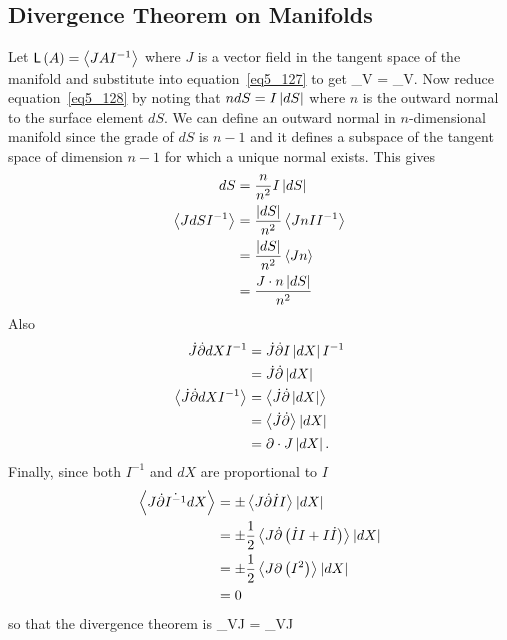 \subsection{Divergence Theorem on Manifolds}
Let ${\mathsf{L}}\left ( {A} \right ) = \left < {JAI^{-1}} \right >_{}$ where $J$ is a vector field in the tangent space of the manifold and substitute into
equation~\ref{eq5_127} to get
\be\label{eq5_128}
 \oint_{\partial V} = \int_{V}.
\ee
Now reduce equation~\ref{eq5_128} by noting that $ndS = I\left | {dS} \right |$ where $n$ is the outward normal to the surface element $dS$. We can define
an outward normal in $n$-dimensional manifold since the grade of $dS$ is $n-1$ and it defines a subspace of the tangent space of dimension $n-1$
for which a unique normal exists. This gives
\begin{align}
dS &= \displaystyle\frac{n}{n^{2}}I\left | {dS} \right | \\
\left < {J dS I^{-1}} \right >_{} &= \displaystyle\frac{\left | {dS} \right |}{n^{2}}\left < {JnII^{-1}} \right >_{} \nonumber \\
                      &= \displaystyle\frac{\left | {dS} \right |}{n^{2}}\left < {Jn} \right >_{} \nonumber \\
                      &= \displaystyle\frac{J\cdot n\left | {dS} \right |}{n^{2}} 
\end{align}
Also
\begin{align}
\dot{J}\dot{\partial}dXI^{-1} &= \dot{J}\dot{\partial}I\left | {dX} \right |I^{-1} \nonumber \\
                              &= \dot{J}\dot{\partial}\left | {dX} \right | \\
\left < {\dot{J}\dot{\partial}dXI^{-1}} \right >_{} &= \left < {\dot{J}\dot{\partial}\left | {dX} \right |} \right >_{} \nonumber \\
                                        &= \left < {\dot{J}\dot{\partial}} \right >_{}\left | {dX} \right | \nonumber \\
                                        &= \partial\cdot J\left | {dX} \right |.
\end{align}
Finally, since both $I^{-1}$ and $dX$ are proportional to $I$
\begin{align}
\left < {J\dot{\partial}\dot{I^{-1}}dX} \right >_{} &= \pm\left < {J\dot{\partial}\dot{I}I} \right >_{}\left | {dX} \right | \nonumber \\
                                        &= \pm\displaystyle\frac{1}{2}\left < {J\dot{\partial}{}\left ( {\dot{I}I+I\dot{I}} \right )} \right >_{}\left | {dX} \right | \nonumber \\
                                        &= \pm\displaystyle\frac{1}{2}\left < {J\partial{}\left ( {I^{2}} \right )} \right >_{}\left | {dX} \right | \nonumber \\
                                        &= 0
\end{align}
so that the divergence theorem is 
\be
 \oint_{\partial V}\cdot J  = \int_{V}\partial\cdot J
\ee
